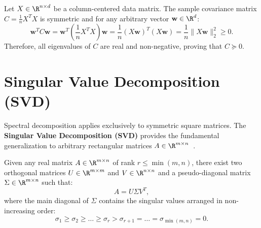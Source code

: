 \begin{example}
Let $X \in \R^{n \times d}$ be a column-centered data matrix. The sample covariance matrix $C = \frac{1}{n} X^T X$ is symmetric and for any arbitrary vector $\mathbf{w} \in \R^d$:
\begin{equation}
    \mathbf{w}^T C \mathbf{w} = \mathbf{w}^T \left(\frac{1}{n} X^T X\right) \mathbf{w} = \frac{1}{n} (X \mathbf{w})^T (X \mathbf{w}) = \frac{1}{n} \|X \mathbf{w}\|_2^2 \ge 0.
\end{equation}
Therefore, all eigenvalues of $C$ are real and non-negative, proving that $C \succeq 0$.
\end{example}

\FloatBarrier
\section{Singular Value Decomposition (SVD)}
\label{sec:svd}

Spectral decomposition applies exclusively to symmetric square matrices. The \textbf{Singular Value Decomposition (SVD)} provides the fundamental generalization to arbitrary rectangular matrices $A \in \R^{m \times n}$~\cite{golub2013matrix,strang2019linear}.

\begin{theorem}
Given any real matrix $A \in \R^{m \times n}$ of rank $r \le \min(m, n)$, there exist two orthogonal matrices $U \in \R^{m \times m}$ and $V \in \R^{n \times n}$ and a pseudo-diagonal matrix $\Sigma \in \R^{m \times n}$ such that:
\begin{equation}
    A = U \Sigma V^T,
\end{equation}
where the main diagonal of $\Sigma$ contains the singular values arranged in non-increasing order:
\begin{equation}
    \sigma_1 \ge \sigma_2 \ge \dots \ge \sigma_r > \sigma_{r+1} = \dots = \sigma_{\min(m, n)} = 0.
\end{equation}
\end{theorem}

